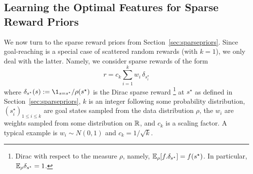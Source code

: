 \documentclass[11pt,a4paper]{article}
\begin{document}
% 
% 
% 

\subsection{Learning the Optimal Features for Sparse Reward Priors}
\label{sec:phisparse}

We now turn to the sparse reward priors from
Section~\ref{sec:sparsepriors}. Since goal-reaching is a special case of
scattered random rewards (with $k=1$), we only deal with the latter.
Namely, we consider sparse rewards of the form
\begin{equation}
\label{eq:sparsereward}
r=c_k \sum_{i=1}^k w_i \,\delta_{s^\star_i}
\end{equation}
where $\delta_{s^\star}(s)\deq
\1_{s=s^\star}/\rho(s^\star)$
is the Dirac sparse reward \footnote{Dirac with respect to the measure $\rho$,
namely, $\mathbb{E}_\rho [f.\delta_{s^\star}]=f(s^\star)$. In
particular, $\mathbb{E}_\rho \delta_{s^\star}=1$.} at
$s^\star$ as defined in Section~\ref{sec:sparsepriors}, 
$k$ is an integer following some probability distribution,
$(s^\star_i)_{1\leq i \leq k}$ are goal states sampled
from the data distribution $\rho$, the $w_i$ are weights sampled from
some distribution on ${\mathbb{R}}$, and $c_k$ is a scaling factor. A typical example is $w_i\sim N(0,1)$ and
$c_k=1/\sqrt{k}$.
\end{document}
